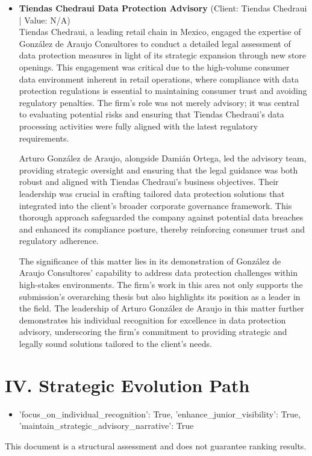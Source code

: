 \documentclass[11pt]{article}
\begin{document}
\begin{itemize}
This matter demonstrates González de Araujo Consultores' strategic advisory role in data protection, showcasing their ability to integrate data protection frameworks into corporate governance for significant clients. This reinforces the firm's editorial thesis of leadership in complex data protection matters, demonstrating their capacity to deliver tailored solutions that align with clients' strategic objectives and regulatory requirements.
\item \textbf{Tiendas Chedraui Data Protection Advisory} (Client: Tiendas Chedraui | Value: N/A)\\ Tiendas Chedraui, a leading retail chain in Mexico, engaged the expertise of González de Araujo Consultores to conduct a detailed legal assessment of data protection measures in light of its strategic expansion through new store openings. This engagement was critical due to the high-volume consumer data environment inherent in retail operations, where compliance with data protection regulations is essential to maintaining consumer trust and avoiding regulatory penalties. The firm's role was not merely advisory; it was central to evaluating potential risks and ensuring that Tiendas Chedraui's data processing activities were fully aligned with the latest regulatory requirements.

Arturo González de Araujo, alongside Damián Ortega, led the advisory team, providing strategic oversight and ensuring that the legal guidance was both robust and aligned with Tiendas Chedraui's business objectives. Their leadership was crucial in crafting tailored data protection solutions that integrated into the client's broader corporate governance framework. This thorough approach safeguarded the company against potential data breaches and enhanced its compliance posture, thereby reinforcing consumer trust and regulatory adherence.

The significance of this matter lies in its demonstration of González de Araujo Consultores' capability to address data protection challenges within high-stakes environments. The firm's work in this area not only supports the submission's overarching thesis but also highlights its position as a leader in the field. The leadership of Arturo González de Araujo in this matter further demonstrates his individual recognition for excellence in data protection advisory, underscoring the firm's commitment to providing strategic and legally sound solutions tailored to the client's needs.

\end{itemize}

\section*{IV. Strategic Evolution Path}
\begin{itemize}
\item {'focus_on_individual_recognition': True, 'enhance_junior_visibility': True, 'maintain_strategic_advisory_narrative': True}
\end{itemize}

\vfill
\centering
\small{This document is a structural assessment and does not guarantee ranking results.}
\end{document}
